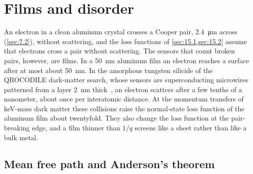 \section{Films and disorder}\label{sec:15.3}

An electron in a clean aluminum crystal crosses a Cooper pair, \SI{2.4}{\micro m} across (\cref{sec:7.2}), without scattering, and the loss functions of \cref{sec:15.1,sec:15.2} assume that electrons cross a pair without scattering. The sensors that count broken pairs, however, are films. In a \SI{50}{nm} aluminum film an electron reaches a surface after at most about \SI{50}{nm}. In the amorphous tungsten silicide of the QROCODILE dark-matter search, whose sensors are superconducting microwires patterned from a layer \SI{2}{nm} thick~\cite{baudis2025first}, an electron scatters after a few tenths of a nanometer, about once per interatomic distance. At the momentum transfers of keV-mass dark matter these collisions raise the normal-state loss function of the aluminum film about twentyfold. They also change the loss function at the pair-breaking edge, and a film thinner than $1/q$ screens like a sheet rather than like a bulk metal.

\subsection{Mean free path and Anderson's theorem}\label{sec:15.3-dirty}


